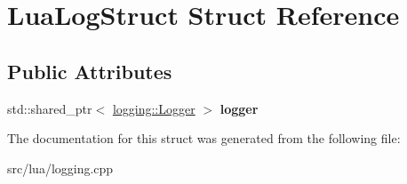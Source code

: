 \hypertarget{structLuaLogStruct}{}\section{Lua\+Log\+Struct Struct Reference}
\label{structLuaLogStruct}
\subsection*{Public Attributes}
\begin{DoxyCompactItemize}
\item 
\mbox{\label{structLuaLogStruct_a2dbc0c810f96207250a82e9a372b2779}} 
std\+::shared\+\_\+ptr$<$ \mbox{\hyperlink{classlogging_1_1Logger}{logging\+::\+Logger}} $>$ {\bfseries logger}
\end{DoxyCompactItemize}


The documentation for this struct was generated from the following file\+:\begin{DoxyCompactItemize}
\item 
src/lua/logging.\+cpp\end{DoxyCompactItemize}
